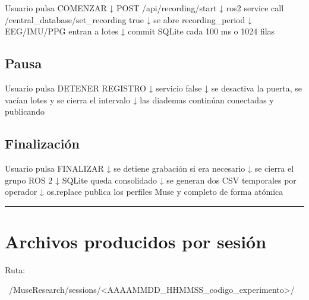 \documentclass[11pt,a4paper]{article}
\begin{document}
\begin{MuseCode}
Usuario pulsa COMENZAR
        ↓
POST /api/recording/start
        ↓
ros2 service call /central_database/set_recording true
        ↓
se abre recording_period
        ↓
EEG/IMU/PPG entran a lotes
        ↓
commit SQLite cada 100 ms o 1024 filas
\end{MuseCode}

\subsection{Pausa}

\begin{MuseCode}
Usuario pulsa DETENER REGISTRO
        ↓
servicio false
        ↓
se desactiva la puerta, se vacían lotes y se cierra el intervalo
        ↓
las diademas continúan conectadas y publicando
\end{MuseCode}

\subsection{Finalización}

\begin{MuseCode}
Usuario pulsa FINALIZAR
        ↓
se detiene grabación si era necesario
        ↓
se cierra el grupo ROS 2
        ↓
SQLite queda consolidado
        ↓
se generan dos CSV temporales por operador
        ↓
os.replace publica los perfiles Muse y completo de forma atómica
\end{MuseCode}

\medskip\hrule\medskip

\section{Archivos producidos por sesión}

Ruta:

\begin{MuseCode}
~/MuseResearch/sessions/<AAAAMMDD_HHMMSS_codigo_experimento>/
\end{MuseCode}
\end{document}
